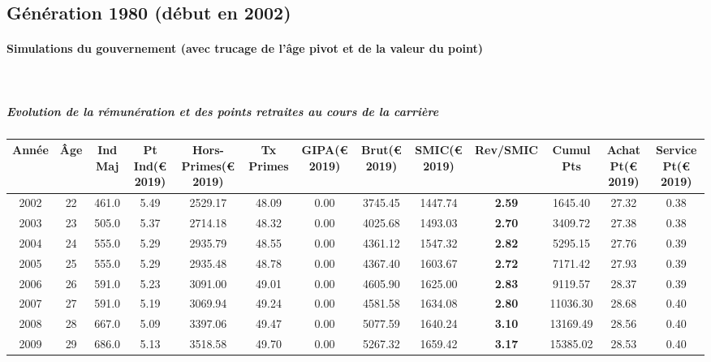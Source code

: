 \newpage 
 
\subsection{Génération 1980 (début en 2002)} 

\paragraph{Simulations du gouvernement (avec trucage de l'âge pivot et de la valeur du point)}  ~\\ 
 
\subparagraph{Evolution de la rémunération et des points retraites au cours de la carrière} 
 
{ \scriptsize \begin{center} 
\begin{tabular}[htb]{|c|c||c|c|c|c|c|c||c|c||c|c|c||} 
\hline 
 Année &  Âge &  Ind Maj &  Pt Ind(\euro{} 2019) &   Hors-Primes(\euro{} 2019) &  Tx Primes &  GIPA(\euro{} 2019) &  Brut(\euro{} 2019) &  SMIC(\euro{} 2019) &  Rev/SMIC &  Cumul Pts &  Achat Pt(\euro{} 2019) &  Service Pt(\euro{} 2019) \\ 
\hline \hline 
 2002 &  22 &  461.0 &  5.49 &  2529.17 &  48.09 &  0.00 &  3745.45 &  1447.74 &  {\bf 2.59} &  1645.40 &  27.32 &  0.38 \\ 
\hline 
 2003 &  23 &  505.0 &  5.37 &  2714.18 &  48.32 &  0.00 &  4025.68 &  1493.03 &  {\bf 2.70} &  3409.72 &  27.38 &  0.38 \\ 
\hline 
 2004 &  24 &  555.0 &  5.29 &  2935.79 &  48.55 &  0.00 &  4361.12 &  1547.32 &  {\bf 2.82} &  5295.15 &  27.76 &  0.39 \\ 
\hline 
 2005 &  25 &  555.0 &  5.29 &  2935.48 &  48.78 &  0.00 &  4367.40 &  1603.67 &  {\bf 2.72} &  7171.42 &  27.93 &  0.39 \\ 
\hline 
 2006 &  26 &  591.0 &  5.23 &  3091.00 &  49.01 &  0.00 &  4605.90 &  1625.00 &  {\bf 2.83} &  9119.57 &  28.37 &  0.39 \\ 
\hline 
 2007 &  27 &  591.0 &  5.19 &  3069.94 &  49.24 &  0.00 &  4581.58 &  1634.08 &  {\bf 2.80} &  11036.30 &  28.68 &  0.40 \\ 
\hline 
 2008 &  28 &  667.0 &  5.09 &  3397.06 &  49.47 &  0.00 &  5077.59 &  1640.24 &  {\bf 3.10} &  13169.49 &  28.56 &  0.40 \\ 
\hline 
 2009 &  29 &  686.0 &  5.13 &  3518.58 &  49.70 &  0.00 &  5267.32 &  1659.42 &  {\bf 3.17} &  15385.02 &  28.53 &  0.40 \\ 

\end{tabular}
\end{center}}
